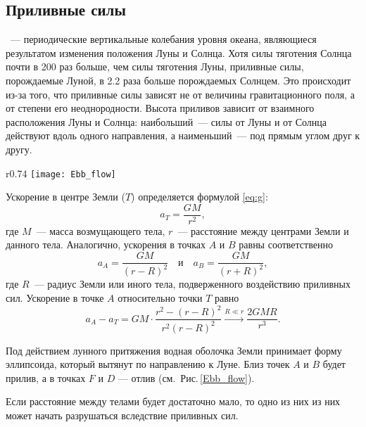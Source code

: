 \subsection{Приливные силы}

~--- периодические вертикальные колебания уровня океана, являющиеся результатом изменения положения Луны и Солнца. Хотя силы тяготения Солнца почти в 200 раз больше, чем силы тяготения Луны, приливные силы, порождаемые Луной, в 2.2 раза больше порождаемых Солнцем. Это происходит из-за того, что приливные силы зависят не от величины гравитационного поля, а от степени его неоднородности. Высота приливов зависит от взаимного расположения Луны и Солнца: наибольший~---  силы от Луны и от Солнца действуют вдоль одного направления, а наименьший~--- под прямым углом друг к другу.

\begin{wrapfigure}[11]{r}{0.74\tw}
    \vspace{-.5pc}
    \texttt{[image: Ebb\_flow]}
    \caption{К объяснению приливных сил}\label{Ebb_flow}
\end{wrapfigure}
Ускорение в центре Земли ($T$) определяется формулой \eqref{eq:g}:
\begin{equation*}
    a_T=\frac{G M}{r^2},
\end{equation*}
где $M$~--- масса возмущающего тела, $r$~--- расстояние между центрами Земли и данного тела. Аналогично, ускорения в точках $A$ и $B$ равны соответственно
\begin{equation}
    a_A = \frac{G M}{(r - R)^2} \quad \text{и} \quad a_B = \frac{GM}{(r + R)^2},
\end{equation}
где $R$~--- радиус Земли или иного тела, подверженного воздействию приливных сил. Ускорение в точке $A$ относительно точки $T$ равно
\begin{equation}
    a_A - a_T = GM \cdot \frac{r^2 - (r - R)^2}{r^2 (r - R)^2} \xrightarrow{R \ll r} \frac{2 G M R}{r^3}.
    \label{eq:ebb-force}
\end{equation}

Под действием лунного притяжения водная оболочка Земли принимает форму
эллипсоида, который вытянут по направлению к Луне. Близ точек $A$ и $B$ будет
прилив, а в точках $F$ и $D$ --- отлив (см.~Рис.\,\ref{Ebb_flow}).

Если расстояние между телами будет достаточно мало, то одно из них из них может начать разрушаться вследствие приливных сил.

